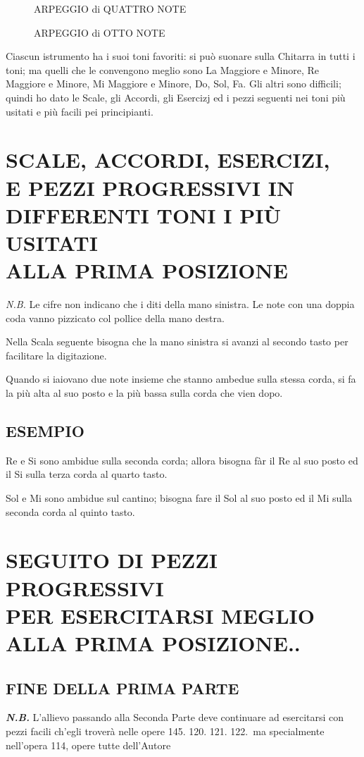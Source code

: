 \documentclass[a4paper]{book}
\begin{document}
\begin{figure}[H]
  \centering
  \hfill
  \begin{minipage}{1.9in}
    \caption{ARPEGGIO di QUATTRO NOTE}
  \end{minipage}
  \hfill
  \begin{minipage}{2.1in}
    \caption{ARPEGGIO di OTTO NOTE}
  \end{minipage}
  \hfill{}
\end{figure}

Ciascun istrumento ha i suoi toni favoriti: si può suonare sulla Chitarra in tutti i toni; ma quelli che le convengono meglio sono La Maggiore e Minore, Re Maggiore e Minore, Mi Maggiore e Minore, Do, Sol, Fa.  Gli altri sono difficili; quindi ho dato le Scale, gli Accordi, gli Esercizj ed i pezzi seguenti nei toni più usitati e più facili pei principianti.

\chapter[Scale, accordi, esercizj e pezzi progressivi in varj toni i più necessarj]{%
  SCALE, ACCORDI, ESERCIZI,\\[.5ex]
  \small E PEZZI PROGRESSIVI IN DIFFERENTI TONI I PIÙ USITATI\\[-1em]
  ALLA PRIMA POSIZIONE}

\textit{N.B\@.}  Le cifre non indicano che i diti della mano sinistra.  Le note con una doppia coda vanno pizzicato col pollice della mano destra.

Nella Scala seguente bisogna che la mano sinistra si avanzi al secondo tasto per facilitare la digitazione.

Quando si iaiovano due note insieme che stanno ambedue sulla stessa corda, si fa la più alta al suo posto e la più bassa sulla corda che vien dopo.

\section*{ESEMPIO}

Re e Si sono ambidue sulla seconda corda; allora bisogna fàr il Re al suo posto ed il Si sulla terza corda al quarto tasto.

Sol e Mi sono ambidue sul cantino; bisogna fare il Sol al suo posto ed il Mi sulla seconda corda al quinto tasto.

\chapter[Seguito di pezzi progressivi per esercitarsi meglio]{%
  SEGUITO DI PEZZI PROGRESSIVI\\
  \small PER ESERCITARSI MEGLIO ALLA PRIMA POSIZIONE..}


\section*{FINE DELLA PRIMA PARTE}

\textit{\bfseries N.B\@.}  L'allievo passando alla Seconda Parte deve continuare ad esercitarsi con pezzi facili ch'egli troverà nelle opere 145. 120. 121. 122.\ ma specialmente nell'opera 114, opere tutte dell'Autore
\end{document}
